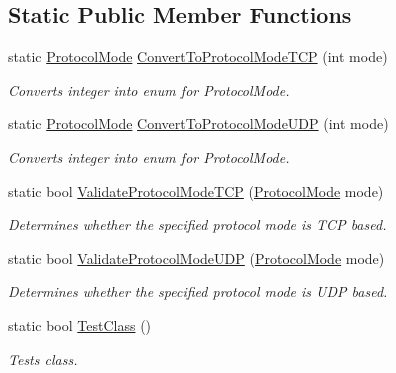 \subsection*{Static Public Member Functions}
\begin{DoxyCompactItemize}
\item 
static \hyperlink{class_net_mode_a43cfa55ee6a4db66a8d7d6c27f766964}{ProtocolMode} \hyperlink{class_net_mode_a825e005771020dac6f89367f04c0b792}{ConvertToProtocolModeTCP} (int mode)
\begin{DoxyCompactList}\small\item\em Converts integer into enum for ProtocolMode. \item\end{DoxyCompactList}\item 
static \hyperlink{class_net_mode_a43cfa55ee6a4db66a8d7d6c27f766964}{ProtocolMode} \hyperlink{class_net_mode_ac2c76177611b178f10d0ba777f026038}{ConvertToProtocolModeUDP} (int mode)
\begin{DoxyCompactList}\small\item\em Converts integer into enum for ProtocolMode. \item\end{DoxyCompactList}\item 
static bool \hyperlink{class_net_mode_ac5373607d50d5601c3dd214e22641d25}{ValidateProtocolModeTCP} (\hyperlink{class_net_mode_a43cfa55ee6a4db66a8d7d6c27f766964}{ProtocolMode} mode)
\begin{DoxyCompactList}\small\item\em Determines whether the specified protocol mode is TCP based. \item\end{DoxyCompactList}\item 
static bool \hyperlink{class_net_mode_a5ec4cf1b0571a74ed746d8d8fbabe986}{ValidateProtocolModeUDP} (\hyperlink{class_net_mode_a43cfa55ee6a4db66a8d7d6c27f766964}{ProtocolMode} mode)
\begin{DoxyCompactList}\small\item\em Determines whether the specified protocol mode is UDP based. \item\end{DoxyCompactList}\item 
static bool \hyperlink{class_net_mode_af062e2de6fe5afa57061632715a5c0ad}{TestClass} ()
\begin{DoxyCompactList}\small\item\em Tests class. \item\end{DoxyCompactList}\end{DoxyCompactItemize}


